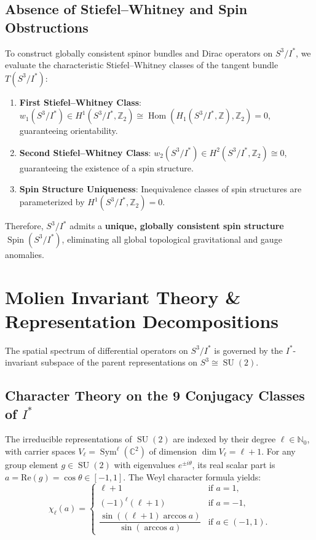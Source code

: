 \documentclass[11pt,a4paper]{article}
\theoremstyle{definition}
\DeclareMathOperator{\Sym}{Sym}
\DeclareMathOperator{\Spin}{Spin}
\DeclareMathOperator{\SU}{SU}
\DeclareMathOperator{\Hom}{Hom}
\begin{document}
\subsection{Absence of Stiefel--Whitney and Spin Obstructions}
To construct globally consistent spinor bundles and Dirac operators on $S^3 / I^*$, we evaluate the characteristic Stiefel--Whitney classes of the tangent bundle $T(S^3/I^*)$:
\begin{enumerate}
\item \textbf{First Stiefel--Whitney Class}: $w_1(S^3 / I^*) \in H^1(S^3/I^*, \mathbb{Z}_2) \cong \Hom(H_1(S^3/I^*, \mathbb{Z}), \mathbb{Z}_2) = 0$, guaranteeing orientability.
\item \textbf{Second Stiefel--Whitney Class}: $w_2(S^3 / I^*) \in H^2(S^3/I^*, \mathbb{Z}_2) \cong 0$, guaranteeing the existence of a spin structure.
\item \textbf{Spin Structure Uniqueness}: Inequivalence classes of spin structures are parameterized by $H^1(S^3/I^*, \mathbb{Z}_2) = 0$.
\end{enumerate}
Therefore, $S^3 / I^*$ admits a \textbf{unique, globally consistent spin structure} $\Spin(S^3 / I^*)$, eliminating all global topological gravitational and gauge anomalies.

\section{Molien Invariant Theory \& Representation Decompositions}

The spatial spectrum of differential operators on $S^3 / I^*$ is governed by the $I^*$-invariant subspace of the parent representations on $S^3 \cong \SU(2)$.

\subsection{Character Theory on the 9 Conjugacy Classes of $I^*$}
The irreducible representations of $\SU(2)$ are indexed by their degree $\ell \in \mathbb{N}_0$, with carrier spaces $V_\ell = \Sym^\ell(\mathbb{C}^2)$ of dimension $\dim V_\ell = \ell + 1$. For any group element $g \in \SU(2)$ with eigenvalues $e^{\pm i \theta}$, its real scalar part is $a = \mathrm{Re}(g) = \cos \theta \in [-1, 1]$. The Weyl character formula yields:
\begin{equation}
\chi_\ell (a) = \begin{cases}
  \ell + 1 & \text{if } a = 1, \\
  (-1)^\ell (\ell + 1) & \text{if } a = -1, \\
  \dfrac{\sin((\ell + 1) \arccos a)}{\sin(\arccos a)} & \text{if } a \in (-1, 1).
\end{cases}
\end{equation}
\end{document}

